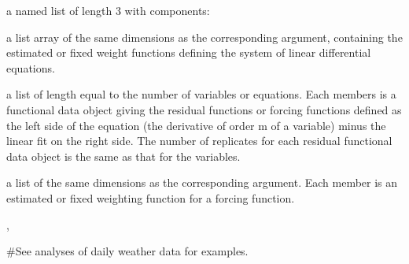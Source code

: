 \documentclass{article}
\begin{document}
\begin{Value}
a named list of length 3 with components:

\begin{ldescription}
\item[\code{bwtlist}] a list array of the same dimensions as the
corresponding argument, containing the estimated or fixed weight
functions defining the system of linear differential equations.

\item[\code{resfdlist}] a list of length equal to the number of variables
or equations.  Each members is a functional data object giving the
residual functions or forcing functions defined as the left side
of the equation (the derivative of order m of a variable) minus
the linear fit on the right side.  The number of replicates for each
residual functional data object is the same as that for the variables.

\item[\code{awtlist}] a list of the same dimensions as the corresponding
argument.  Each member is an estimated or fixed weighting function for
a forcing function.

\end{ldescription}
\end{Value}
\begin{SeeAlso}\relax
{}, 
\end{SeeAlso}
\begin{Examples}
\begin{ExampleCode}
#See analyses of daily weather data for examples.
\end{ExampleCode}
\end{Examples}
\end{document}

